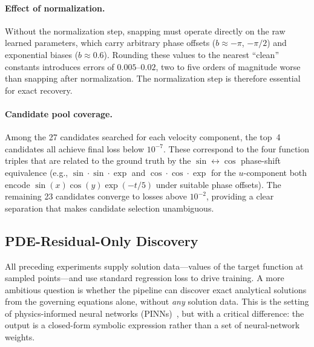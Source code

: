 \paragraph{Effect of normalization.}
Without the normalization step, snapping must operate directly on the raw
learned parameters, which carry arbitrary phase offsets
($b \approx -\pi$, $-\pi/2$) and exponential biases ($b \approx 0.6$).
Rounding these values to the nearest ``clean'' constants introduces errors of
$0.005$--$0.02$, two to five orders of magnitude worse than snapping after
normalization.  The normalization step is therefore essential for exact
recovery.

\paragraph{Candidate pool coverage.}
Among the 27 candidates searched for each velocity component, the top~4
candidates all achieve final loss below $10^{-7}$.  These correspond to the
four function triples that are related to the ground truth by the
$\sin\leftrightarrow\cos$ phase-shift equivalence (e.g.,
$\sin\!\cdot\!\sin\!\cdot\!\exp$ and $\cos\!\cdot\!\cos\!\cdot\!\exp$ for the
$u$-component both encode $\sin(x)\cos(y)\exp(-t/5)$ under suitable phase
offsets).  The remaining 23 candidates converge to losses above $10^{-2}$,
providing a clear separation that makes candidate selection unambiguous.

\subsection{PDE-Residual-Only Discovery}
\label{sec:pde_residual}

All preceding experiments supply solution data---values of the target function
at sampled points---and use standard regression loss to drive training.  A
more ambitious question is whether the pipeline can discover exact analytical
solutions from the governing equations alone, without \emph{any} solution
data.  This is the setting of physics-informed neural networks
(PINNs)~\citep{raissi2019}, but with a critical difference: the output is a
closed-form symbolic expression rather than a set of neural-network weights.

